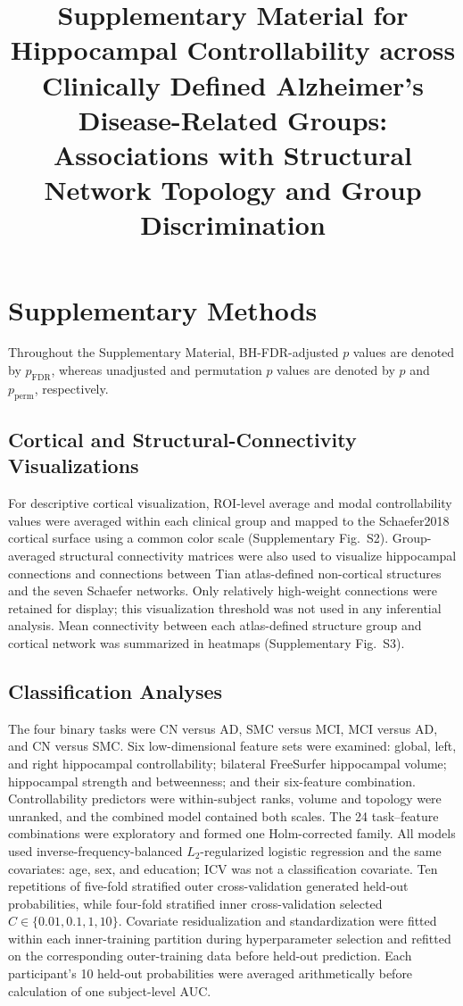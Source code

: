 \documentclass{article}
\title{Supplementary Material for Hippocampal Controllability across Clinically Defined Alzheimer's Disease-Related Groups: Associations with Structural Network Topology and Group Discrimination}
\author{}
\date{}
\begin{document}
\maketitle

\section{Supplementary Methods}

Throughout the Supplementary Material, BH-FDR-adjusted \(p\) values are denoted by \(p_{\mathrm{FDR}}\), whereas unadjusted and permutation \(p\) values are denoted by \(p\) and \(p_{\mathrm{perm}}\), respectively.

\subsection{Cortical and Structural-Connectivity Visualizations}
For descriptive cortical visualization, ROI-level average and modal controllability values were averaged within each clinical group and mapped to the Schaefer2018 cortical surface using a common color scale (Supplementary Fig.~S2). Group-averaged structural connectivity matrices were also used to visualize hippocampal connections and connections between Tian atlas-defined non-cortical structures and the seven Schaefer networks. Only relatively high-weight connections were retained for display; this visualization threshold was not used in any inferential analysis. Mean connectivity between each atlas-defined structure group and cortical network was summarized in heatmaps (Supplementary Fig.~S3).

\subsection{Classification Analyses}
The four binary tasks were CN versus AD, SMC versus MCI, MCI versus AD, and CN versus SMC. Six low-dimensional feature sets were examined: global, left, and right hippocampal controllability; bilateral FreeSurfer hippocampal volume; hippocampal strength and betweenness; and their six-feature combination. Controllability predictors were within-subject ranks, volume and topology were unranked, and the combined model contained both scales. The 24 task--feature combinations were exploratory and formed one Holm-corrected family. All models used inverse-frequency-balanced \(L_2\)-regularized logistic regression and the same covariates: age, sex, and education; ICV was not a classification covariate. Ten repetitions of five-fold stratified outer cross-validation generated held-out probabilities, while four-fold stratified inner cross-validation selected \(C\in\{0.01,0.1,1,10\}\). Covariate residualization and standardization were fitted within each inner-training partition during hyperparameter selection and refitted on the corresponding outer-training data before held-out prediction. Each participant's 10 held-out probabilities were averaged arithmetically before calculation of one subject-level AUC.
\end{document}
